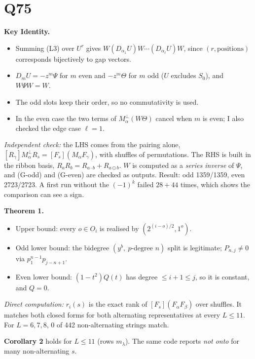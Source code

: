 \documentclass[11pt]{article}
\begin{document}
\section{Q75}
\textbf{Key Identity.}
\begin{itemize}[nosep]
\item Summing (L3) over $U^r$ gives $W(D_{\alpha_1}U)W\cdots(D_{\alpha_\ell}U)W$, since $(r,\text{positions})$ corresponds bijectively to gap vectors.
\item $D_mU=-z^m\Psi$ for $m$ even and $-z^m\Theta$ for $m$ odd ($U$ excludes $S_0$), and $W\Psi W=W$.
\item The odd slots keep their order, so no commutativity is used.
\item In the even case the two terms of $M_\alpha^\perp(W\Theta)$ cancel when $m$ is even; I also checked the edge case $\ell=1$.
\end{itemize}
\emph{Independent check:} the LHS comes from the pairing alone, $[R_\gamma]M_\alpha^\perp R_s=[F_s](M_\alpha F_\gamma)$, with shuffles of permutations. The RHS is built in the ribbon basis, $R_aR_b=R_{a\cdot b}+R_{a\odot b}$. $W$ is computed as a \emph{series inverse} of $\Psi$, and (G-odd) and (G-even) are checked as outputs. Result: odd 1359/1359, even 2723/2723. A first run without the $(-1)^k$ failed $28+44$ times, which shows the comparison can see a sign.

\textbf{Theorem 1.}
\begin{itemize}[nosep]
\item Upper bound: every $o\in O_i$ is realised by $(2^{(i-o)/2},1^o)$.
\item Odd lower bound: the bidegree $(y^b,\ p\text{-degree }n)$ split is legitimate; $P_{n,j}\ne0$ via $p_1^{n-1}p_{j-n+1}$.
\item Even lower bound: $(1-t^2)Q(t)$ has degree $\le i+1\le j$, so it is constant, and $Q=0$.
\end{itemize}
\emph{Direct computation:} $r_i(s)$ is the exact rank of $[F_s](F_\alpha F_\beta)$ over shuffles. It matches both closed forms for both alternating representatives at every $L\le11$. For $L=6,7,8$, 0 of 442 non-alternating strings match.

\textbf{Corollary 2} holds for $L\le 11$ (rows $m_\lambda$). The same code reports \emph{not onto} for many non-alternating $s$.
\end{document}
